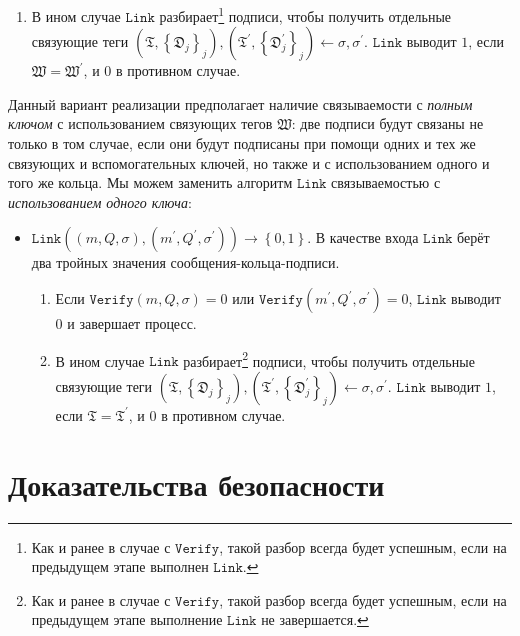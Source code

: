 \documentclass{llncs}
\begin{document}
\begin{definition}[$d$-CLSAG]
\begin{itemize}
\begin{enumerate}
\item В ином случае $\texttt{Link}$ разбирает\footnote{Как и ранее в случае с $\texttt{Verify}$, такой разбор всегда будет успешным, если на предыдущем этапе выполнен $\texttt{Link}$.} подписи, чтобы получить отдельные связующие теги $(\mathfrak{T}, \left\{\mathfrak{D}_j\right\}_j), (\mathfrak{T}^\prime, \left\{\mathfrak{D}^\prime_j\right\}_j) \leftarrow \sigma, \sigma^\prime$. $\texttt{Link}$ выводит $1$, если $\mathfrak{W} = \mathfrak{W}^\prime$, и $0$ в противном случае.
\end{enumerate}
\end{itemize}
\end{definition}

Данный вариант реализации предполагает наличие связываемости с \textit{полным ключом} с использованием связующих тегов $\mathfrak{W}$: две подписи будут связаны не только в том случае, если они будут подписаны при помощи одних и тех же связующих и вспомогательных ключей, но также и с использованием одного и того же кольца. Мы можем заменить алгоритм $\texttt{Link}$ связываемостью с \textit{использованием одного ключа}:
\begin{itemize}

\item $\texttt{Link}\left((m, Q, \sigma), (m^\prime, Q^\prime, \sigma^\prime)\right) \to \left\{0,1\right\}$. В качестве входа $\texttt{Link}$ берёт два тройных значения сообщения-кольца-подписи.
\begin{enumerate}
\item Если $\texttt{Verify}(m, Q, \sigma) = 0$ или $\texttt{Verify}(m^\prime, Q^\prime, \sigma^\prime) = 0$, $\texttt{Link}$ выводит $0$ и завершает процесс.

\item В ином случае $\texttt{Link}$ разбирает\footnote{Как и ранее в случае с  $\texttt{Verify}$, такой разбор всегда будет успешным, если на предыдущем этапе выполнение $\texttt{Link}$ не завершается.} подписи, чтобы получить отдельные связующие теги $(\mathfrak{T}, \left\{\mathfrak{D}_j\right\}_j), (\mathfrak{T}^\prime, \left\{\mathfrak{D}^\prime_j\right\}_j) \leftarrow \sigma, \sigma^\prime$. $\texttt{Link}$ выводит $1$, если $\mathfrak{T} = \mathfrak{T}^\prime$, и $0$ в противном случае.
\end{enumerate}
\end{itemize}


\section{Доказательства безопасности}
\end{document}
